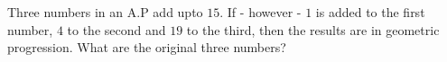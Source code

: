 
%
%
%
%
% 
% 

\question Three numbers in an A.P add upto $15$. If - however - $1$ is added to the first number,
$4$ to the second and $19$ to the third, then the results are in geometric progression. What are 
the original three numbers?

\insertQR{}

\ifprintanswers

\fi 


